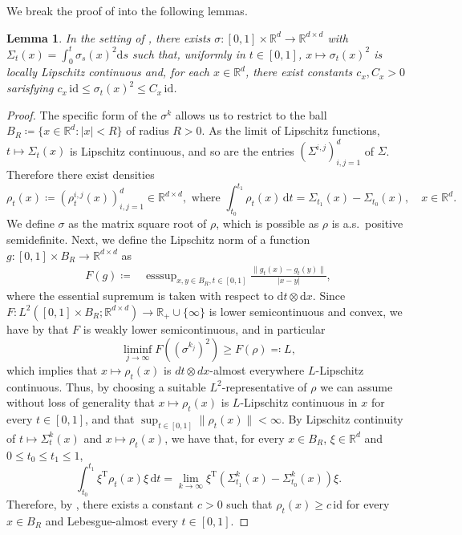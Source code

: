 \documentclass[12pt,oneside]{amsart}
\newtheorem{lemma}[theorem]{Lemma}
\theoremstyle{definition}
\newcommand{\id}{\mathrm{id}}
\newcommand{\D}{\mathrm{d}}
\newcommand{\R}{\mathbb R}
\def\R{{\mathbb R}}
\numberwithin{equation}{section}
\begin{document}
We break the proof of  into the following lemmas.

\begin{lemma}
    \label{lem:Lipschitz_continuity_sigma}
    In the setting of , there exists $\sigma \colon [0,1] \times \R^d \to \R^{d \times d}$ with $\Sigma_t(x) = \int_0^t\sigma_s(x)^2 \D s$ such that, uniformly in $t \in [0, 1]$, $x \mapsto \sigma_t(x)^2$ is locally Lipschitz continuous and, for each $x \in \R^d$, there exist constants $c_x, C_x > 0$ sarisfying $c_x \, \id \leq \sigma_t(x)^2 \leq C_x \, \id$.
\end{lemma}

\begin{proof}
	The specific form of the $\sigma^k$ allows us to restrict to the ball $B_R \coloneqq \{ x \in \R^d \colon |x| < R \}$ of radius $R > 0$.
    As the limit of Lipschitz functions, $t \mapsto \Sigma_t(x)$ is Lipschitz continuous, and so are the entries $(\Sigma^{i,j})_{i,j = 1}^d$ of $\Sigma$.
    Therefore there exist densities
    \begin{equation}
        \rho_t(x) \coloneqq (\rho^{i,j}_t(x))_{i,j = 1}^d \in \R^{d \times d},  \mbox{ where } \int_{t_0}^{t_1} \rho_t(x) \, \D t = \Sigma_{t_1}(x) - \Sigma_{t_0}(x), \quad x \in \R^d.
    \end{equation}
    We define $\sigma$ as the matrix square root of $\rho$, which is possible as $\rho$ is a.s.\ positive semidefinite.
    Next, we define the Lipschitz norm of a function $g \colon [0,1] \times B_R \to \R^{d \times d}$ as
    \begin{align}
        F(g)  \coloneqq& \operatorname{esssup}_{x,y \in B_R, t \in [0,1]} \frac{\|g_t(x) - g_t(y)\|}{|x - y|},
    \end{align}
    where the essential supremum is taken with respect to $\D t \otimes \D x$.
    Since $F \colon L^2([0,1] \times B_R; \R^{d \times d}) \to \R_+ \cup \{ \infty\}$ is lower semicontinuous and convex, we have by \cite[Theorem 9.1]{BaCo11} that $F$ is weakly lower semicontinuous, and in particular
    \begin{equation}
        \liminf_{j \to \infty} F((\sigma^{k_j})^2) \ge F(\rho) \eqqcolon L,
    \end{equation}
    which implies that $x \mapsto \rho_t(x)$ is $dt \otimes dx$-almost everywhere $L$-Lipschitz continuous.
    Thus, by choosing a suitable $L^2$-representative of $\rho$ we can assume without loss of generality that $x \mapsto \rho_t(x)$ is $L$-Lipschitz continuous in $x$ for every $t \in [0, 1]$, and that $\sup_{t \in [0,1]} \|\rho_t(x)\| < \infty$.
    By Lipschitz continuity of $t \mapsto \Sigma^k_t(x)$ and $x \mapsto \rho_t(x)$, we have that, for every $x \in B_R$, $\xi \in \R^d$ and $0 \leq t_0 \leq t_1 \leq 1$,
    \begin{equation}
        \int_{t_0}^{t_1} \xi^\textrm{T} \rho_t(x) \xi \, \D t = \lim_{k \to \infty} \xi^\textrm{T} \!\left( \Sigma^k_{t_1}(x) - \Sigma^k_{t_0}(x) \right)\! \xi.
    \end{equation}
    Therefore, by , there exists a constant $c > 0$ such that $\rho_t(x) \ge c \, \id$ for every $x \in B_R$ and Lebesgue-almost every $t \in [0,1]$.
 \end{proof}
\end{document}
